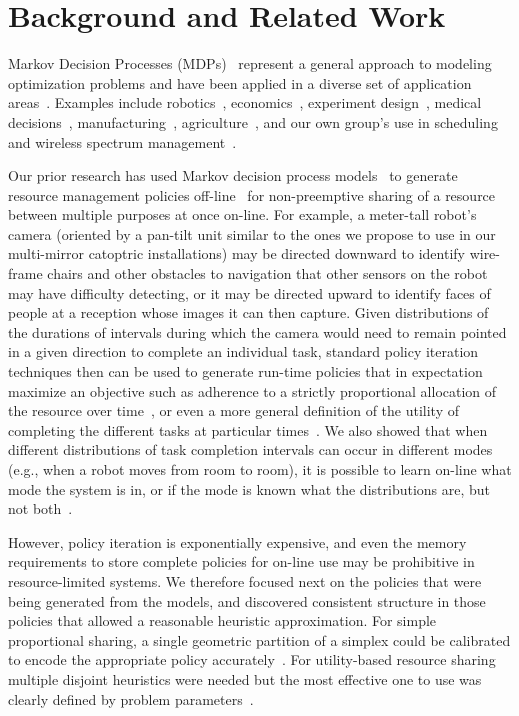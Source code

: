 \section{Background and Related Work}
\label{sec:background}



Markov Decision Processes (MDPs)~\cite{puterman} represent a general approach
to modeling optimization problems and have been applied in a diverse set of
application areas~\cite{White93}. Examples include robotics~\cite{ab10}, 
economics~\cite{bs98}, experiment design~\cite{kb85},
medical decisions~\cite{ahsr10}, manufacturing~\cite{yyl04},
agriculture~\cite{Kristensen03},
and our own group's use in scheduling~\cite{gtsg08,tggs10}
and wireless spectrum management~\cite{mgc16}.

Our prior research has used Markov decision process
models~\cite{gtsg08} to generate resource management policies
off-line~\cite{gtgs09} for non-preemptive sharing of a resource
between multiple purposes at once on-line.  For example, a meter-tall robot's
camera (oriented by a pan-tilt unit similar to the ones we propose to
use in our multi-mirror catoptric installations) may be directed
downward to identify wire-frame chairs and other obstacles to
navigation that other sensors on the robot may have difficulty
detecting, or it may be directed upward to identify faces of people at
a reception whose images it can then capture. Given distributions of
the durations of intervals during which the camera would need to
remain pointed in a given direction to complete an individual task,
standard policy iteration techniques then can be used to generate
run-time policies that in expectation maximize an objective such as
adherence to a strictly proportional allocation of the resource over
time~\cite{gtsg08}, or even a more general definition of the utility 
of completing the different tasks at particular times~\cite{tggs10}.
We also showed that when different distributions of task completion
intervals can occur in different modes (e.g., when a robot moves
from room to room), it is possible to learn on-line what mode
the system is in, or if the mode is known what the distributions are,
but not both~\cite{gtgsuai10}.

However, policy iteration is exponentially expensive, and even the memory 
requirements to store complete policies for on-line use may be prohibitive 
in resource-limited systems.  We therefore focused next on the policies 
that were being generated from the models, and discovered consistent 
structure in those policies that allowed a reasonable heuristic 
approximation.  For simple proportional sharing, a single geometric partition
of a simplex could be calibrated to encode the appropriate policy accurately~\cite{gtspmgs10}.
For utility-based resource sharing multiple disjoint heuristics were needed but
the most effective one to use was clearly defined by problem parameters~\cite{tblwgs11}.

